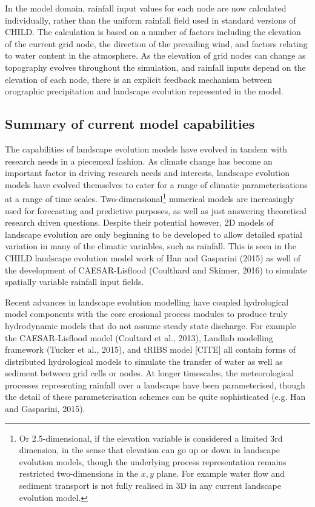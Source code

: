 In the model domain, rainfall input values for each node are now calculated individually, rather than the uniform rainfall field used in standard versions of CHILD. The calculation is based on a number of factors including the elevation of the current grid node, the direction of the prevailing wind, and factors relating to water content in the atmosphere. As the elevation of grid nodes can change as topography evolves throughout the simulation, and rainfall inputs depend on the elevation of each node, there is an explicit feedback mechanism between orographic precipitation and landscape evolution represented in the model. 

\subsection{Summary of current model capabilities}

The capabilities of landscape evolution models have evolved in tandem with research needs in a piecemeal fashion. As climate change has become an important factor in driving research needs and interests, landscape evolution models have evolved themselves to cater for a range of climatic parameterisations at a range of time scales. Two-dimensional\footnote{Or 2.5-dimensional, if the elevation variable is considered a limited 3rd dimension, in the sense that elevation can go up or down in landscape evolution models, though the underlying process representation remains restricted two-dimensions in the \(x,y\) plane. For example water flow and sediment transport is not fully realised in 3D in any current landscape evolution model.} numerical models are increasingly used for forecasting and predictive purposes, as well as just answering theoretical research driven questions. Despite their potential however, 2D models of landscape evolution are only beginning to be developed to allow detailed spatial variation in many of the climatic variables, such as rainfall. This is seen in the CHILD landscape evolution model work of Han and Gasparini (2015) as well of the development of CAESAR-Lisflood (Coulthard and Skinner, 2016) to simulate spatially variable rainfall input fields. 

Recent advances in landscape evolution modelling have coupled hydrological model components with the core erosional process modules to produce truly hydrodynamic models that do not assume steady state discharge. For example the CAESAR-Lisflood model (Coultard et al., 2013), Landlab modelling framework (Tucker et al., 2015), and tRIBS model [CITE] all contain forms of distributed hydrological models to simulate the transfer of water as well as sediment between grid cells or nodes. At longer timescales, the meteorological processes representing rainfall over a landscape have been parameterised, though the detail of these parameterisation schemes can be quite sophisticated (e.g. Han and Gasparini, 2015).

